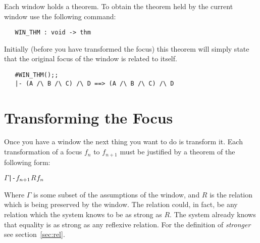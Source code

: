 Each window holds a theorem.
To obtain the theorem held by the current window use the following command:
\begin{boxed}\begin{verbatim}
   WIN_THM : void -> thm
\end{verbatim}\end{boxed}
Initially (before you have transformed the focus) this theorem 
will simply state that the original focus of the window is related to itself.
\begin{session}\begin{verbatim}
   #WIN_THM();;
   |- (A /\ B /\ C) /\ D ==> (A /\ B /\ C) /\ D
\end{verbatim}\end{session}

\section{Transforming the Focus}

Once you have a window the next thing you want to do is transform it.
Each transformation of a focus $f_n$ to $f_{n+1}$ must be justified by a 
theorem of the following form:
\begin{alltt}
   \(\Gamma\) |- \(f\sb{n+1}\) \(R\) \(f\sb{n}\)
\end{alltt}
Where $\Gamma$ is some subset of the assumptions of the window, and
$R$\/ is the relation which is being preserved by the window.
The relation could, in fact, be any relation which the
system knows to be as strong as $R$.
The system already knows that equality is as strong as any reflexive relation.
For the definition of {\it stronger\/} see section~\ref{sec:rel}.

